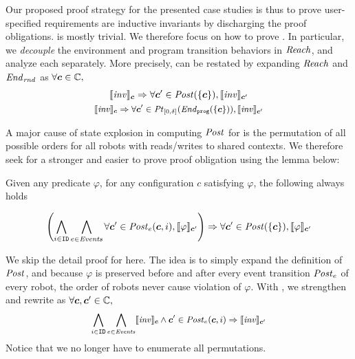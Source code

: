 Our proposed proof strategy for the presented case studies is thus to prove
user-specified requirements are inductive invariants by discharging the proof obligations.
 is mostly trivial.
We therefore focus on how to prove .
In particular, we \emph{decouple} the environment and program transition behaviors in $\mathit{Reach}$,
and analyze each separately.
More precisely,  can be restated by expanding $\mathit{Reach}$ and $\mathit{End}_\mathit{rnd}$ as $\forall \mathit{\boldsymbol{c}} \in \mathbb{C},$
\begin{gather}
\llbracket\mathit{inv}\rrbracket_{\mathit{\boldsymbol{c}}} \Rightarrow \forall \mathit{\boldsymbol{c}}' \in \mathit{Post}(\left\{\mathit{\boldsymbol{c}}\right\}), \llbracket\mathit{inv}\rrbracket_{\mathit{\boldsymbol{c}}'}\label{po:ind-hyp-prog}\\
\small
\llbracket\mathit{inv}\rrbracket_{\mathit{\boldsymbol{c}}} \Rightarrow \forall \mathit{\boldsymbol{c}}' \in \mathit{Pt}_{[0,\delta]}(\mathit{End}_{\mathtt{prog}}(\left\{\mathit{\boldsymbol{c}}\right\})), \llbracket\mathit{inv}\rrbracket_{\mathit{\boldsymbol{c}}'}\label{po:ind-hyp-env}
\end{gather}

A major cause of state explosion in computing $\mathit{Post}$ for 
is the permutation of all possible orders for all robots
with reads/writes to shared contexts.
We therefore seek for a stronger and easier to prove proof obligation using the lemma below:
\begin{lemma}
   \label{lem:noninter}
Given any predicate $\varphi$,
for any configuration $c$ satisfying $\varphi$, the following always holds
\begin{small}
\[
\left(\bigwedge_{i\in \texttt{ID}}\bigwedge_{e \in \mathit{Events}} \forall \mathit{\boldsymbol{c}}' \in \mathit{Post}_e(\mathit{\boldsymbol{c}}, i), \llbracket\varphi\rrbracket_{\mathit{\boldsymbol{c}}'}\right)
    \Rightarrow \forall \mathit{\boldsymbol{c}}' \in \mathit{Post}(\left\{\mathit{\boldsymbol{c}}\right\}), \llbracket\varphi\rrbracket_{\mathit{\boldsymbol{c}}'}
\]
\end{small}

\end{lemma}
We skip the detail proof for  here.
The idea is to simply expand the definition of $\mathit{Post}$,
and because $\varphi$ is preserved before and after every event transition $\mathit{Post}_e$ of every robot,
the order of robots never cause violation of $\varphi$.
With , we strengthen and rewrite  as $\forall \mathit{\boldsymbol{c}}, \mathit{\boldsymbol{c}}' \in \mathbb{C},$
\begin{equation}
\small
\bigwedge_{i\in \texttt{ID}}\bigwedge_{e \in \mathit{Events}} \llbracket\mathit{inv}\rrbracket_{\mathit{\boldsymbol{c}}} \land \mathit{\boldsymbol{c}}' \in \mathit{Post}_e(\mathit{\boldsymbol{c}}, i)
    \Rightarrow \llbracket\mathit{inv}\rrbracket_{\mathit{\boldsymbol{c}}'}\label{po:ind-hyp-event}
\end{equation}
Notice that we no longer have to enumerate all permutations.

